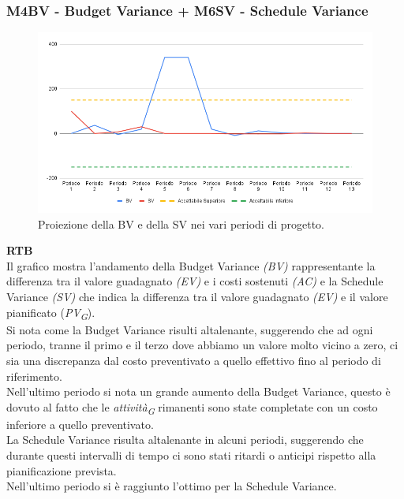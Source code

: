 \subsubsection{M4BV - Budget Variance + M6SV - Schedule Variance}

\vspace{0.3cm}

\begin{figure}[H]
    \centering
    \includegraphics[width=1\textwidth]{../Images/PianoDiQualifica/BV_SV.png}
    \caption{Proiezione della BV e della SV nei vari periodi di progetto.}
    \label{fig:5}
\end{figure}

\vspace{0.2cm}

\textbf{RTB} \\
Il grafico mostra l'andamento della Budget Variance \textit{(BV)} rappresentante la differenza tra il valore guadagnato \textit{(EV)} e i costi sostenuti \textit{(AC)} e la Schedule Variance \textit{(SV)} che indica la differenza tra il valore guadagnato \textit{(EV)} e il valore pianificato (\textit{PV}\textsubscript{\textit{G}}). \\
Si nota come la Budget Variance risulti altalenante, suggerendo che ad ogni periodo, tranne il primo e il terzo dove abbiamo un valore molto vicino a zero, ci sia una discrepanza dal costo preventivato a quello effettivo fino al periodo di riferimento. \\
Nell'ultimo periodo si nota un grande aumento della Budget Variance, questo è dovuto al fatto che le \textit{attività}\textsubscript{\textit{G}} rimanenti sono state completate con un costo inferiore a quello preventivato. \\
La Schedule Variance risulta altalenante in alcuni periodi, suggerendo che durante questi intervalli di tempo ci sono stati ritardi o anticipi rispetto alla pianificazione prevista. \\
Nell'ultimo periodo si è raggiunto l'ottimo per la Schedule Variance. 


